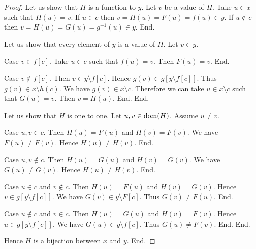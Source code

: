 \documentclass{article}
\begin{document}
\begin{forthel}
\begin{proof}
        Let us show that $H$ is a function to $y$.
          Let $v$ be a value of $H$.
          Take $u \in x$ such that $H(u) = v$.
          If $u \in c$ then $v = H(u) = F(u) = f(u) \in y$.
          If $u \notin c$ then $v = H(u) = G(u) = g^{-1}(u) \in y$.
        End.

        Let us show that every element of $y$ is a value of $H$.
          Let $v \in y$.

          Case $v \in f[c]$.
            Take $u \in c$ such that $f(u) = v$.
            Then $F(u) = v$.
          End.

          Case $v \notin f[c]$.
            Then $v \in y \setminus f[c]$.
            Hence $g(v) \in g[y \setminus f[c]]$.
            Thus $g(v) \in x \setminus h(c)$.
            We have $g(v) \in x \setminus c$.
            Therefore we can take $u \in x \setminus c$ such that $G(u) = v$.
            Then $v = H(u)$.
          End.
        End.

        Let us show that $H$ is one to one.
          Let $u,v \in \operatorname{dom}(H)$.
          Assume $u \neq v$.

          Case $u,v \in c$.
            Then $H(u) = F(u)$ and $H(v) = F(v)$.
            We have $F(u) \neq F(v)$.
            Hence $H(u) \neq H(v)$.
          End.

          Case $u,v \notin c$.
            Then $H(u) = G(u)$ and $H(v) = G(v)$.
            We have $G(u) \neq G(v)$.
            Hence $H(u) \neq H(v)$.
          End.

          Case $u \in c$ and $v \notin c$.
            Then $H(u) = F(u)$ and $H(v) = G(v)$.
            Hence $v \in g[y \setminus f[c]]$.
            We have $G(v) \in y \setminus F[c]$.
            Thus $G(v) \neq F(u)$.
          End.

          Case $u \notin c$ and $v \in c$.
            Then $H(u) = G(u)$ and $H(v) = F(v)$.
            Hence $u \in g[y \setminus f[c]]$.
            We have $G(u) \in y \setminus f[c]$.
            Thus $G(u) \neq F(v)$.
          End.
        End.

        Hence $H$ is a bijection between $x$ and $y$.
      End.
    \end{proof}
  \end{forthel}
\end{document}
